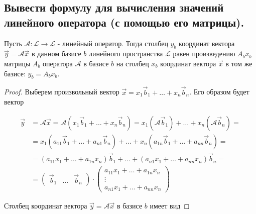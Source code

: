 \subsection{
    Вывести формулу для вычисления значений линейного оператора (с помощью его матрицы).
}

\begin{theorem}
    Пусть $\mathscr{A} \colon \mathcal{L} \to \mathcal{L}$ - линейный оператор. Тогда столбец $y_b$ координат вектора $\vec{y} = \mathscr{A}\vec{x}$ в данном базисе $b$ линейного пространства $\mathcal{L}$ равен произведению $A_bx_b$ матрицы $A_b$ оператора $\mathscr{A}$ в базисе $b$ на столбец $x_b$ координат вектора $\vec{x}$ в том же базисе: $y_b = A_bx_b$.
    \label{thm:theorem_21_1}
\end{theorem}

\begin{proof}
    Выберем произвольный вектор $\vec{x} = x_1\vec{b}_1 + \ldots + x_n\vec{b}_n$. Его образом будет вектор

    \begin{align*}
        \vec{y} &= \mathscr{A}\vec{x} =  \mathscr{A}(x_1\vec{b}_1 + \ldots + x_n\vec{b}_n) = x_1(\mathscr{A}\vec{b}_1) + \ldots + x_n(\mathscr{A}\vec{b}_n) = \\
        &= x_1(a_{11}\vec{b}_1 + \ldots + a_{n1}\vec{b}_n) + \ldots + x_n(a_{1n}\vec{b}_1 + \ldots + a_{nn}\vec{b}_n) = \\
        &= (a_{11}x_1 + \ldots + a_{1n}x_n)\vec{b}_1 + \ldots + (a_{n1}x_1 + \ldots + a_{nn}x_n)\vec{b}_n = \\
        &= \begin{pmatrix}
            \vec{b}_1 & \ldots & \vec{b}_n
        \end{pmatrix} \cdot \begin{pmatrix} 
            a_{11}x_1 + \ldots + a_{1n}x_n \\
            \vdots \\
            a_{n1}x_1 + \ldots + a_{nn}x_n
        \end{pmatrix}
    \end{align*}

    Столбец координат вектора $\vec{y} = \mathscr{A}\vec{x}$ в базисе $b$ имеет вид


\end{proof}
